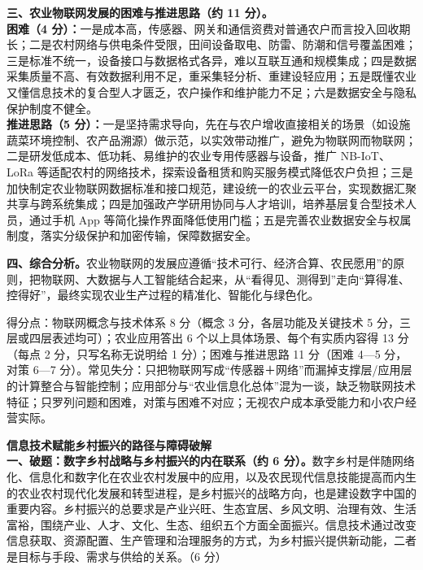 \documentclass[a4paper,11pt]{article}
\begin{document}
\textbf{三、农业物联网发展的困难与推进思路（约 11 分）。}\\
\textbf{困难（4 分）：}一是成本高，传感器、网关和通信资费对普通农户而言投入回收期长；二是农村网络与供电条件受限，田间设备取电、防雷、防潮和信号覆盖困难；三是标准不统一，设备接口与数据格式各异，难以互联互通和规模集成；四是数据采集质量不高、有效数据利用不足，重采集轻分析、重建设轻应用；五是既懂农业又懂信息技术的复合型人才匮乏，农户操作和维护能力不足；六是数据安全与隐私保护制度不健全。\\
\textbf{推进思路（5 分）：}一是坚持需求导向，先在与农户增收直接相关的场景（如设施蔬菜环境控制、农产品溯源）做示范，以实效带动推广，避免为物联网而物联网；二是研发低成本、低功耗、易维护的农业专用传感器与设备，推广 NB-IoT、LoRa 等适配农村的网络技术，探索设备租赁和购买服务模式降低农户负担；三是加快制定农业物联网数据标准和接口规范，建设统一的农业云平台，实现数据汇聚共享与跨系统集成；四是加强政产学研用协同与人才培训，培养基层复合型技术人员，通过手机 App 等简化操作界面降低使用门槛；五是完善农业数据安全与权属制度，落实分级保护和加密传输，保障数据安全。

\textbf{四、综合分析。}农业物联网的发展应遵循“技术可行、经济合算、农民愿用”的原则，把物联网、大数据与人工智能结合起来，从“看得见、测得到”走向“算得准、控得好”，最终实现农业生产过程的精准化、智能化与绿色化。

\begin{analysis}得分点：物联网概念与技术体系 8 分（概念 3 分，各层功能及关键技术 5 分，三层或四层表述均可）；农业应用答出 6 个以上具体场景、每个有实质内容得 13 分（每点 2 分，只写名称无说明给 1 分）；困难与推进思路 11 分（困难 4—5 分，对策 6—7 分）。常见失分：只把物联网写成“传感器＋网络”而漏掉支撑层/应用层的计算整合与智能控制；应用部分与“农业信息化总体”混为一谈，缺乏物联网技术特征；只罗列问题和困难，对策与困难不对应；无视农户成本承受能力和小农户经营实际。\end{analysis}

\q \textbf{信息技术赋能乡村振兴的路径与障碍破解}\\
\textbf{一、破题：数字乡村战略与乡村振兴的内在联系（约 6 分）。}数字乡村是伴随网络化、信息化和数字化在农业农村发展中的应用，以及农民现代信息技能提高而内生的农业农村现代化发展和转型进程，是乡村振兴的战略方向，也是建设数字中国的重要内容。乡村振兴的总要求是产业兴旺、生态宜居、乡风文明、治理有效、生活富裕，围绕产业、人才、文化、生态、组织五个方面全面振兴。信息技术通过改变信息获取、资源配置、生产管理和治理服务的方式，为乡村振兴提供新动能，二者是目标与手段、需求与供给的关系。（6 分）
\end{document}
